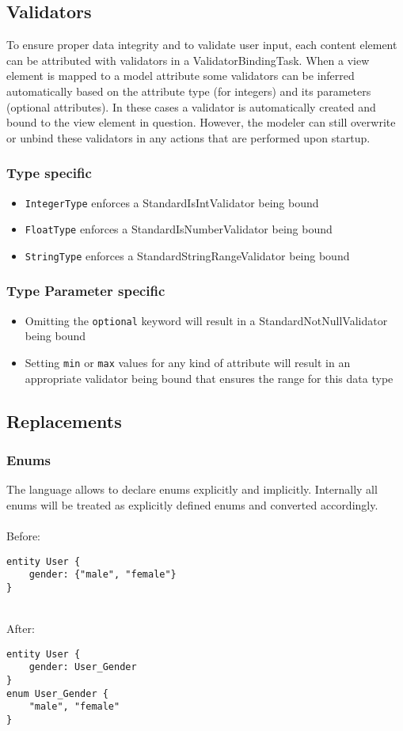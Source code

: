 \subsection{Validators}
To ensure proper data integrity and to validate user input, each content element can be attributed with validators in a ValidatorBindingTask. When a view element is mapped to a model attribute some validators can be inferred automatically based on the attribute type (\eg for integers) and its parameters (\eg optional attributes). In these cases a validator is automatically created and bound to the view element in question. However, the modeler can still overwrite or unbind these validators in any actions that are performed upon startup.

\subsubsection{Type specific}
\begin{itemize}
\item \lstinline!IntegerType! enforces a StandardIsIntValidator being bound
\item \lstinline!FloatType! enforces a StandardIsNumberValidator being bound
\item \lstinline!StringType! enforces a StandardStringRangeValidator being bound
\end{itemize}

\subsubsection{Type Parameter specific}

\begin{itemize}
\item Omitting the \lstinline!optional! keyword will result in a StandardNotNullValidator being bound
\item Setting \lstinline!min! or \lstinline!max! values for any kind of attribute will result in an appropriate validator being bound that ensures the range for this data type
\end{itemize}

\subsection{Replacements}
\subsubsection{Enums}
The \MD language allows to declare enums explicitly and implicitly. Internally all enums will be treated as explicitly defined enums and converted accordingly. \\ \\
Before:
\begin{lstlisting}[language=MD2]
entity User {
	gender: {"male", "female"}
}
\end{lstlisting}
~
\\
After:
\begin{lstlisting}[language=MD2]
entity User {
	gender: User_Gender
}
enum User_Gender {
	"male", "female"
}
\end{lstlisting}



